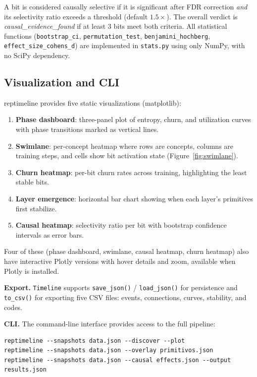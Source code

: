 \documentclass[11pt]{article}
\begin{document}
A bit is considered causally selective if it is significant after FDR correction \emph{and} its selectivity ratio exceeds a threshold (default $1.5\times$). The overall verdict is \emph{causal\_evidence\_found} if at least 3 bits meet both criteria. All statistical functions (\texttt{bootstrap\_ci}, \texttt{permutation\_test}, \texttt{benjamini\_hochberg}, \texttt{effect\_size\_cohens\_d}) are implemented in \texttt{stats.py} using only NumPy, with no SciPy dependency.

\subsection{Visualization and CLI}

reptimeline provides five static visualizations (matplotlib):
\begin{enumerate}[nosep]
    \item \textbf{Phase dashboard}: three-panel plot of entropy, churn, and utilization curves with phase transitions marked as vertical lines.
    \item \textbf{Swimlane}: per-concept heatmap where rows are concepts, columns are training steps, and cells show bit activation state (Figure~\ref{fig:swimlane}).
    \item \textbf{Churn heatmap}: per-bit churn rates across training, highlighting the least stable bits.
    \item \textbf{Layer emergence}: horizontal bar chart showing when each layer's primitives first stabilize.
    \item \textbf{Causal heatmap}: selectivity ratio per bit with bootstrap confidence intervals as error bars.
\end{enumerate}
Four of these (phase dashboard, swimlane, causal heatmap, churn heatmap) also have interactive Plotly versions with hover details and zoom, available when Plotly is installed.

\textbf{Export.} \texttt{Timeline} supports \texttt{save\_json()} / \texttt{load\_json()} for persistence and \texttt{to\_csv()} for exporting five CSV files: events, connections, curves, stability, and codes.

\textbf{CLI.} The command-line interface provides access to the full pipeline:
\begin{verbatim}
reptimeline --snapshots data.json --discover --plot
reptimeline --snapshots data.json --overlay primitivos.json
reptimeline --snapshots data.json --causal effects.json --output results.json
\end{verbatim}
\end{document}
